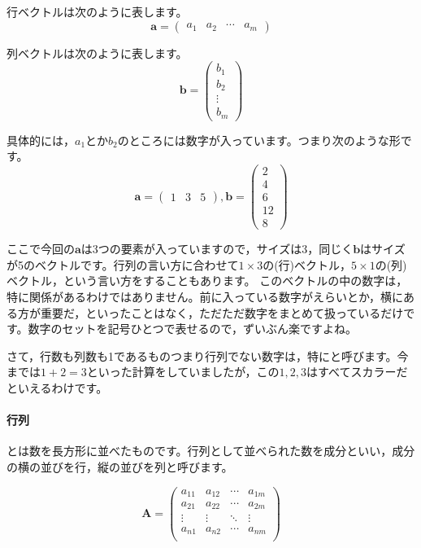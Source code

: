\documentclass{ltjsbook}
\begin{document}
行ベクトルは次のように表します。
\begin{equation*}
    \bm{a}=
\begin{pmatrix}
a_1 & a_2 & \cdots & a_m
\end{pmatrix}
\end{equation*}

列ベクトルは次のように表します。
\begin{equation*}
    \bm{b}=
\begin{pmatrix}
b_1\\ b_2\\ \vdots \\ b_m
\end{pmatrix}
\end{equation*}

具体的には，$a_1$とか$b_2$のところには数字が入っています。つまり次のような形です。
\begin{equation*}
    \bm{a}=
    \begin{pmatrix}
    1 & 3 & 5
    \end{pmatrix},
    \bm{b}=
\begin{pmatrix}
2 \\ 4\\ 6\\ 12 \\ 8
\end{pmatrix}
\end{equation*}

ここで今回の$\bm{a}$は3つの要素が入っていますので，サイズは3，同じく$\bm{b}$はサイズが5のベクトルです。行列の言い方に合わせて$1 \times 3$の(行)ベクトル，$5 \times 1$の(列)ベクトル，という言い方をすることもあります。
このベクトルの中の数字は，特に関係があるわけではありません。前に入っている数字がえらいとか，横にある方が重要だ，といったことはなく，ただただ数字をまとめて扱っているだけです。数字のセットを記号ひとつで表せるので，ずいぶん楽ですよね。

さて，行数も列数も1であるものつまり行列でない数字は，特にと呼びます。今までは$1+2=3$といった計算をしていましたが，この$1,2,3$はすべてスカラーだといえるわけです。

\paragraph{行列}
とは数を長方形に並べたものです。行列として並べられた数を成分といい，成分の横の並びを行，縦の並びを列と呼びます。

\begin{equation*}
    \bm{A}=
    \begin{pmatrix}
        a_{11} & a_{12} & \cdots & a_{1m}\\
        a_{21} & a_{22} & \cdots & a_{2m}\\
        \vdots & \vdots & \ddots & \vdots\\
        a_{n1} & a_{n2} & \cdots & a_{nm}\\
    \end{pmatrix}
\end{equation*}
\end{document}
